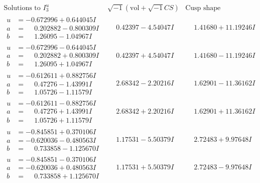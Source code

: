 \documentclass[1p]{elsarticle_modified}
\theoremstyle{definition}
\newcommand{\I}{\sqrt{-1}}
\begin{document}
$$\begin{array}{c|c|c}  
\text{Solutions to }I^u_{3}& \I (\text{vol} + \sqrt{-1}CS) & \text{Cusp shape}\\
 \hline 
\begin{aligned}
u &= -0.672996 + 0.644045 I \\
a &= \phantom{-}0.202882 - 0.800309 I \\
b &= \phantom{-}1.26095 - 1.04967 I\end{aligned}
 & \phantom{-}0.42397 - 4.54047 I & \phantom{-}1.41680 + 11.19246 I \\ \hline\begin{aligned}
u &= -0.672996 - 0.644045 I \\
a &= \phantom{-}0.202882 + 0.800309 I \\
b &= \phantom{-}1.26095 + 1.04967 I\end{aligned}
 & \phantom{-}0.42397 + 4.54047 I & \phantom{-}1.41680 - 11.19246 I \\ \hline\begin{aligned}
u &= -0.612611 + 0.882756 I \\
a &= \phantom{-}0.47276 - 1.43991 I \\
b &= \phantom{-}1.05726 - 1.11579 I\end{aligned}
 & \phantom{-}2.68342 - 2.20216 I & \phantom{-}1.62901 - 11.36162 I \\ \hline\begin{aligned}
u &= -0.612611 - 0.882756 I \\
a &= \phantom{-}0.47276 + 1.43991 I \\
b &= \phantom{-}1.05726 + 1.11579 I\end{aligned}
 & \phantom{-}2.68342 + 2.20216 I & \phantom{-}1.62901 + 11.36162 I \\ \hline\begin{aligned}
u &= -0.845851 + 0.370106 I \\
a &= -0.620036 - 0.480563 I \\
b &= \phantom{-}0.733858 - 1.125670 I\end{aligned}
 & \phantom{-}1.17531 - 5.50379 I & \phantom{-}2.72483 + 9.97648 I \\ \hline\begin{aligned}
u &= -0.845851 - 0.370106 I \\
a &= -0.620036 + 0.480563 I \\
b &= \phantom{-}0.733858 + 1.125670 I\end{aligned}
 & \phantom{-}1.17531 + 5.50379 I & \phantom{-}2.72483 - 9.97648 I \\ \hline\begin{aligned}

\end{aligned}
\end{array}$$
\end{document}
